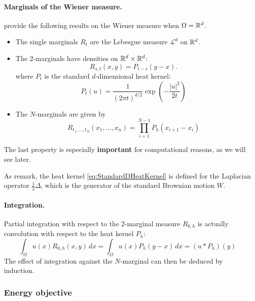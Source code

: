 \documentclass[../report.tex]{subfiles}
\begin{document}
\paragraph{Marginals of the Wiener measure.} \textcite{benamou2018entropy} provide the following results on the Wiener measure when $\Omega = \mathbb{R}^d$.
\begin{itemize}
	\item The single marginals $R_t$ are the Lebesgue measure $\mathcal{L}^d$ on $\mathbb{R}^d$.
	\item The 2-marginals have densities on $\mathbb{R}^d \times \mathbb{R}^d$:
	\begin{equation}\label{eq:2MarginWienerMeasure}
		R_{s,t}(x,y) = P_{t-s}(y-x).
	\end{equation}
	where $P_t$ is the standard $d$-dimensional heat kernel:
	\begin{equation}\label{eq:StandardDHeatKernel}
		P_t(u) =
		\frac{1}{(2\pi t)^{d/2}} \exp\left(
		-\frac{|u|^2}{2t}
		\right)
	\end{equation}
	\item The $N$-marginals are given by
	\begin{equation}
		R_{t_1,\ldots,t_N}(x_1,\ldots,x_n) = 
		\prod_{i=1}^{N-1}
		P_{h}(x_{i+1}-x_i)
	\end{equation}
\end{itemize}
The last property is especially \textbf{important} for computational reasons, as we will see later.

\begin{remark}
	As \textcite[p.~5]{benamou2018entropy} remark, the heat kernel \eqref{eq:StandardDHeatKernel} is defined for the Laplacian operator $\frac{1}{2}\Delta$, which is the generator of the standard Brownian motion $W$.
\end{remark}


\paragraph{Integration.} Partial integration with respect to the 2-marginal measure $R_{0,h}$ is actually convolution with respect to the heat kernel $P_h$:
\[
	\int_\Omega u(x) R_{0,h}(x,y)\,dx =
	\int_\Omega u(x) P_h(y-x)\,dx =
	(u * P_h)(y)
\]
The effect of integration against the $N$-marginal can then be deduced by induction.


\subsubsection{Energy objective}
\end{document}
